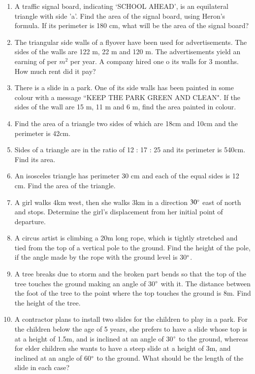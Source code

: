 \begin{enumerate}[label=\thesection.\arabic*.,ref=\thesection.\theenumi]
\item A traffic signal board, indicating ‘SCHOOL AHEAD’, is an equilateral triangle with side 'a'. Find the area of the signal board, using Heron's formula. If its perimeter is 180 cm, what will be the area of the signal board?
\item The triangular side walls of a flyover have been used for advertisements. The sides of the walls are 122 m, 22 m and 120 m. The advertisements yield an earning of  per $m^2$ per year.  A company hired one o its walls for 3 months. How  much rent did it pay?
\item There is a slide in a park. One of its side walls has been painted in some colour with a message ``KEEP THE PARK GREEN AND CLEAN". If the sides of the wall are 15 m, 11 m and 6 m, find the area painted in colour.
\item Find the area of a triangle two sides of which are 18cm and 10cm and the perimeter is 42cm.
\item Sides of a triangle are in the ratio of 12 : 17 : 25 and its perimeter is 540cm. Find its area. 
\item  An isosceles triangle has perimeter 30 cm and each of the equal sides is 12 cm. Find the area of the triangle.
\item A girl walks 4km west, then she walks 3km in a direction $30\degree$ east of north and stops.  Determine the girl's displacement from her initial point of departure.
%
\item A circus artist is climbing a 20m long rope, which is tightly stretched and tied from the top of a vertical pole to the ground.  Find the height of the pole, if the angle made by the rope with the ground level is 30$\degree$.
%
\item A tree breaks due to storm and the broken part bends so that the top of the tree touches the ground making an angle of 30$\degree$ with it.  The distance between the foot of the tree to the point where the top touches the ground is 8m.  Find the height of the tree.
%
\item A contractor plans to install two slides for the children to play in a park.  For the children below the age of 5 years, she prefers to have a slide whose top is at a height of 1.5m, and is inclined at an angle of 30$\degree$  to the ground, whereas for elder children she wants to have a steep slide at a height of 3m, and inclined at an angle of 60$\degree$ to the ground.  What should be the length of the slide in each case?

\end{enumerate}
